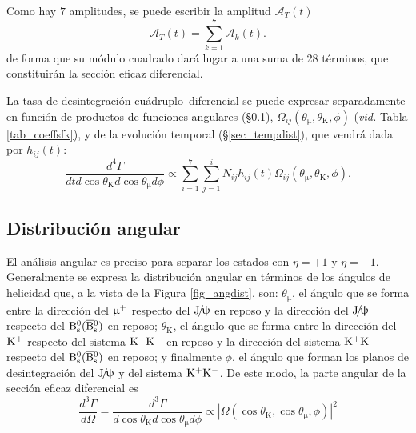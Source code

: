 Como hay $7$ amplitudes, se puede escribir la amplitud $\mathcal{A}_T(t)$
\begin{equation}
\mathcal{A}_T(t) = \sum_{k=1}^{7} \mathcal{A}_k (t).	
\end{equation}
de forma que su módulo cuadrado dará lugar a una suma de 28 términos, que constituirán la sección eficaz diferencial. 

La tasa de desintegración cuádruplo--diferencial se puede expresar separadamente en función de productos de funciones angulares (\S \ref{sec_angdist}), $\Omega_{ij}(\theta_{\upmu},\theta_{\text{K}},\phi)$ (\emph{vid.} Tabla \ref{tab_coeffsfk}), y de la evolución temporal (\S \ref{sec_tempdist}), que vendrá dada por $h_{ij}(t)$:
%
\begin{equation}
\frac{d^4 \Gamma}{dt d\cos\theta_{\text{K}} d\cos\theta_{\upmu} d\phi} \propto \sum_{i=1}^{7}  \sum_{j=1}^i N_{ij} h_{ij}(t) \Omega_{ij}(\theta_{\upmu},\theta_{\text{K}},\phi).
\end{equation}


\subsection{Distribución angular} %
\label{sec_angdist}

El análisis angular es preciso para separar los estados con $\eta = +1$ y $\eta = -1$.
Generalmente se expresa la distribución angular en términos de los ángulos de helicidad que, a la vista de la Figura \ref{fig_angdist}, son: $\theta_{\upmu}$, el ángulo que se forma entre la dirección del $\upmu{}^{+}$ respecto del $\text{J}\!/\!\uppsi$ en reposo y la dirección del $\text{J}\!/\!\uppsi$ respecto del $\text{B}{}_{\text{s}}^{\text{0}}(\overline{\text{B}}{}_{\text{s}}^{\text{0}})$ en reposo; $\theta_{\text{K}}$, el ángulo que se forma entre la dirección del $\text{K}{}^{+}$ respecto del sistema $\text{K}{}^{+}\text{K}{}^{-}$ en reposo y la dirección del sistema $\text{K}{}^{+}\text{K}{}^{-}$ respecto del $\text{B}{}_{\text{s}}^{\text{0}}(\overline{\text{B}}{}_{\text{s}}^{\text{0}})$ en reposo; y finalmente $\phi$, el ángulo que forman los planos de desintegración del $\text{J}\!/\!\uppsi$ y del sistema $\text{K}{}^{+}\text{K}{}^{-}$.
%
De este modo, la parte angular de la sección eficaz diferencial es
\begin{equation}
\frac{d^3 \Gamma}{d \Omega} = \frac{d^3 \Gamma}{d \cos\theta_{\text{K}} d\cos\theta_{\upmu} d\phi}	\propto |\Omega(\cos\theta_{\text{K}} ,\cos\theta_{\upmu} ,\phi) |^2
\end{equation}


